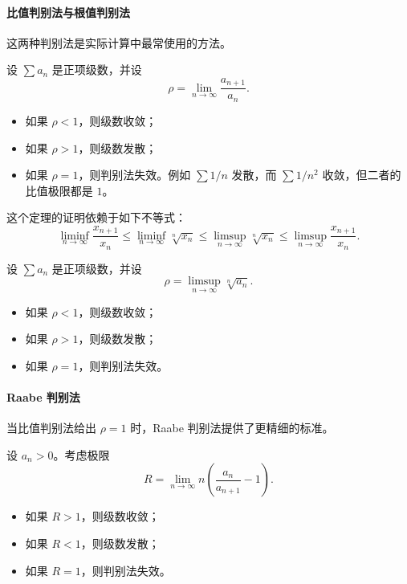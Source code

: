 \paragraph{比值判别法与根值判别法}

这两种判别法是实际计算中最常使用的方法。

\begin{theorem}
设 $\sum a_n$ 是正项级数，并设
\[
    \rho=\lim_{n\to\infty}\frac{a_{n+1}}{a_n}.
\]
\begin{itemize}
    \item 如果 $\rho<1$，则级数收敛；
    \item 如果 $\rho>1$，则级数发散；
    \item 如果 $\rho=1$，则判别法失效。例如 $\sum 1/n$ 发散，而 $\sum 1/n^2$ 收敛，但二者的比值极限都是 $1$。
\end{itemize}
\end{theorem}

这个定理的证明依赖于如下不等式：
\[
\liminf_{n\to\infty}\frac{x_{n+1}}{x_n}
\leq \liminf_{n\to\infty}\sqrt[n]{x_n}
\leq \limsup_{n\to\infty}\sqrt[n]{x_n}
\leq \limsup_{n\to\infty}\frac{x_{n+1}}{x_n}.
\]

\begin{theorem}
设 $\sum a_n$ 是正项级数，并设
\[
    \rho=\limsup_{n\to\infty}\sqrt[n]{a_n}.
\]
\begin{itemize}
    \item 如果 $\rho<1$，则级数收敛；
    \item 如果 $\rho>1$，则级数发散；
    \item 如果 $\rho=1$，则判别法失效。
\end{itemize}
\end{theorem}

\paragraph{Raabe 判别法}

当比值判别法给出 $\rho=1$ 时，Raabe 判别法提供了更精细的标准。

\begin{theorem}
设 $a_n>0$。考虑极限
\[
    R=\lim_{n\to\infty}n\left(\frac{a_n}{a_{n+1}}-1\right).
\]
\begin{itemize}
    \item 如果 $R>1$，则级数收敛；
    \item 如果 $R<1$，则级数发散；
    \item 如果 $R=1$，则判别法失效。
\end{itemize}
\end{theorem}

